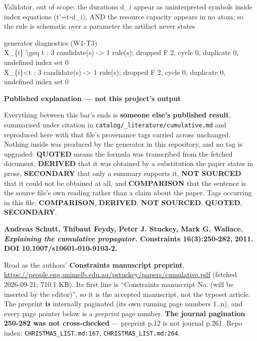 \documentclass[10pt,a4paper]{article}
\newcommand{\diag}[1]{{\small\itshape\raggedright #1\par}}
\newcommand{\provtag}[2]{{\small\sffamily\bfseries\textcolor{#1}{#2}}}
\newenvironment{pubblock}{%
  \par\smallskip
  \def\FrameCommand{\textcolor{litbar}{\vrule width 2.5pt}\hspace{9pt}}%
  \MakeFramed{\advance\hsize-\width\FrameRestore}}%
  {\endMakeFramed\par\smallskip}
\newcommand{\pubhead}[1]{{\sffamily\bfseries\large\textcolor{litbar}{#1}\par}}
\newcommand{\litsub}[1]{\par\smallskip{\sffamily\bfseries\textcolor{litbar}{#1}\par}}
\begin{document}
\diag{Validator, out of scope: the durations d\_i appear as uninterpreted symbols inside index equations (t'=t-d\_i), AND the resource capacity appears in no atom, so the rule is schematic over a parameter the artifact never states}

\diag{generator diagnostics (W1-T3)\\{} X\_\{i\} \textbackslash{}geq t : 3 candidate(s) -> 1 rule(s); dropped F 2, cycle 0, duplicate 0, undefined index set 0\\{} X\_\{i\}<t : 3 candidate(s) -> 1 rule(s); dropped F 2, cycle 0, duplicate 0, undefined index set 0}

\begin{pubblock}
\pubhead{Published explanation --- not this project's output}
{\small\sffamily Everything between this bar's ends is \textbf{someone else's published result}, summarised under citation in \texttt{catalog/\_\allowbreak{}literature/cumulative.md} and reproduced here with that file's provenance tags carried across unchanged. Nothing inside was produced by the generator in this repository, and no tag is upgraded: \provtag{tagquoted}{QUOTED} means the formula was transcribed from the fetched document, \provtag{tagderived}{DERIVED} that it was obtained by a substitution the paper states in prose, \provtag{tagsecondary}{SECONDARY} that only a summary supports it, \provtag{tagnotsourced}{NOT SOURCED} that it could not be obtained at all, and \provtag{tagcomparison}{COMPARISON} that the sentence is the source file's own reading rather than a claim about the paper. Tags occurring in this file: \provtag{tagcomparison}{COMPARISON}, \provtag{tagderived}{DERIVED}, \provtag{tagnotsourced}{NOT SOURCED}, \provtag{tagquoted}{QUOTED}, \provtag{tagsecondary}{SECONDARY}.\par}
\litsub{Citation}
\textbf{Andreas Schutt, Thibaut Feydy, Peter J. Stuckey, Mark G. Wallace. \emph{Explaining the cumulative propagator.} Constraints 16(3):250-282, 2011. DOI 10.1007/s10601-010-9103-2.}

Read as the authors' \textbf{Constraints manuscript preprint}, \url{https://people.eng.unimelb.edu.au/pstuckey/papers/cumulative.pdf} (fetched 2026-09-21; 710.1 KB). Its first line is ``Constraints manuscript No. (will be inserted by the editor)'', so it is the accepted manuscript, not the typeset article. The preprint \textbf{is} internally paginated (its own running page numbers 1..n), and every page pointer below is a \emph{preprint} page number. \textbf{The journal pagination 250-282 was not cross-checked} --- preprint p.12 is not journal p.261. Repo index: \texttt{CHRISTMAS\_LIST.md:167}, \texttt{CHRISTMAS\_LIST.md:264}.


\end{pubblock}
\end{document}
